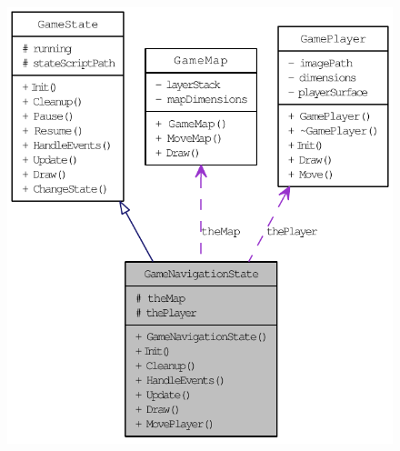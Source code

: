 \begin{figure}[H]
\begin{center}
\leavevmode
\includegraphics[width=354pt]{d1/d57/class_game_navigation_state__coll__graph}
\end{center}
\end{figure}
